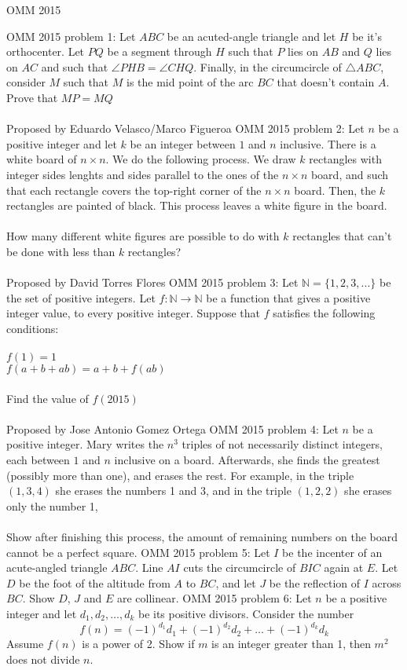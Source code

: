 OMM 2015 

OMM 2015 problem 1:  Let $ABC$ be an acuted-angle triangle and let $H$ be it's orthocenter. Let $PQ$ be a segment through $H$ such that $P$ lies on $AB$ and $Q$ lies on $AC$ and such that $ \angle PHB= \angle CHQ$. Finally, in the circumcircle of $\triangle ABC$, consider $M$ such that $M$ is the mid point of the arc $BC$ that doesn't contain $A$. Prove that $MP=MQ$ \\\\
Proposed by Eduardo Velasco/Marco Figueroa 
OMM 2015 problem 2:  Let $n$ be a positive integer and let $k$ be an integer between $1$ and $n$ inclusive. There is a white board of $n \times n$. We do the following process. We draw $k$ rectangles with integer sides lenghts and sides parallel to the ones of the $n \times n$ board, and such that each rectangle covers the top-right corner of the $n \times n$ board. Then, the $k$ rectangles are painted of black. This process leaves a white figure in the board. \\\\
How many different white figures are possible to do with $k$ rectangles that can't be done with less than $k$ rectangles? \\\\
Proposed by David Torres Flores 
OMM 2015 problem 3:  Let $\mathbb{N} =\{1, 2, 3, ...\}$ be the set of positive integers. Let $f : \mathbb{N} \rightarrow \mathbb{N}$ be a function that gives a positive integer value, to every positive integer. Suppose that $f$ satisfies the following conditions: \\\\
$f(1)=1$ \\
$f(a+b+ab)=a+b+f(ab)$ \\\\
Find the value of $f(2015)$ \\\\
Proposed by Jose Antonio Gomez Ortega 
OMM 2015 problem 4:  Let $n$ be a positive integer. Mary writes the $n^3$ triples of not necessarily distinct integers, each between $1$ and $n$ inclusive on a board. Afterwards, she finds the greatest (possibly more than one), and erases the rest. For example, in the triple $(1, 3, 4)$ she erases the numbers 1 and 3, and in the triple $(1, 2, 2)$ she erases only the number 1, \\\\
Show after finishing this process, the amount of remaining numbers on the board cannot be a perfect square. 
OMM 2015 problem 5:  Let $I$ be the incenter of an acute-angled triangle $ABC$. Line $AI$ cuts the circumcircle of $BIC$ again at $E$. Let $D$ be the foot of the altitude from $A$ to $BC$, and let $J$ be the reflection of $I$ across $BC$. Show $D$, $J$ and $E$ are collinear. 
OMM 2015 problem 6:  Let $n$ be a positive integer and let $d_1, d_2, \dots, d_k$ be its positive divisors. Consider the number
\[ f(n) = (-1)^{d_1}d_1 + (-1)^{d_2}d_2 + \dots + (-1)^{d_k}d_k \]
Assume $f(n)$ is a power of 2. Show if $m$ is an integer greater than 1, then $m^2$ does not divide $n$. 

